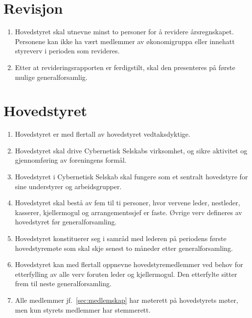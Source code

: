 \documentclass[8pt,norsk,a4paper]{article}
\begin{document}
\section{Revisjon}
\begin{enumerate}
	\item{Hovedstyret skal utnevne minst to personer for å revidere årsregnskapet. Personene kan ikke ha vært medlemmer av økonomigruppa eller innehatt styreverv i perioden som revideres.}
	\item{Etter at revideringsrapporten er ferdigstilt, skal den presenteres på første mulige generalforsamlig.}
\end{enumerate}

\section{Hovedstyret}
\begin{enumerate}
	\item{Hovedstyret er med  flertall av hovedstyret vedtaksdyktige.}
	\item{Hovedstyret skal drive Cybernetisk Selskabs virksomhet, og sikre aktivitet og gjennomføring av foreningens formål.}
	\item{Hovedstyret i Cybernetisk Selskab skal fungere som et sentralt hovedstyre for sine understyrer og arbeidsgrupper.}
	\item{Hovedstyret skal bestå av fem til ti personer, hvor vervene leder, nestleder, kasserer, kjellermogul og arrangementssjef er faste. Øvrige verv defineres av hovedstyret før generalforsamling.}
	\item{Hovedstyret konstituerer seg i samråd med lederen på periodens første hovedstyremøte som skal skje senest to måneder etter generalforsamling.}
	\item{Hovedstyret kan med  flertall oppnevne hovedstyremedlemmer ved behov for etterfylling av alle verv foruten leder og kjellermogul. Den etterfylte sitter frem til neste generalforsamling.} 
	\item{Alle medlemmer jf.~\ref{sec:medlemskap} har møterett på hovedstyrets møter, men kun styrets medlemmer har stemmerett.}
\end{enumerate}
\end{document}
